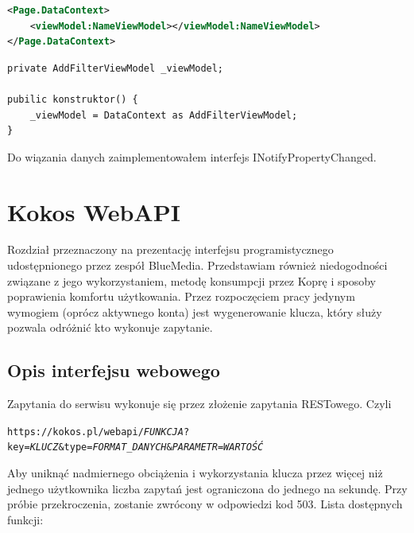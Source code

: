 \documentclass[a4paper,twoside,titlepage,openright]{book}
\begin{document}

\begin{lstlisting}[caption=Podpięcie widok-modelu do Widoku w pliku XAML, label=lst:test, language=xml]
<Page.DataContext>
	<viewModel:NameViewModel></viewModel:NameViewModel>
</Page.DataContext>
\end{lstlisting}


\begin{lstlisting}[caption=Podpięcie widok-modelu w pliku Code-Behind. W konstruktorze inicjalizuje obiekt podając widok-model\, z którym jest spięty., label=lst:test]
private AddFilterViewModel _viewModel;

pubilic konstruktor() {
	_viewModel = DataContext as AddFilterViewModel;
}
\end{lstlisting}

Do wiązania danych zaimplementowałem interfejs INotifyPropertyChanged. 



\section{Kokos WebAPI}

Rozdział przeznaczony na prezentację interfejsu programistycznego udostępnionego przez zespół BlueMedia. Przedstawiam również niedogodności związane z jego wykorzystaniem, metodę konsumpcji przez Koprę i sposoby poprawienia komfortu użytkowania. Przez rozpoczęciem pracy jedynym wymogiem (oprócz aktywnego konta) jest wygenerowanie klucza, który służy pozwala odróżnić kto wykonuje zapytanie.

\subsection{Opis interfejsu webowego}

Zapytania do serwisu wykonuje się przez złożenie zapytania RESTowego. Czyli 

\begin{center}
\texttt{https://kokos.pl/webapi/\textit{FUNKCJA}?key=\textit{KLUCZ}\&type=\textit{FORMAT\_DANYCH}\&\textit{PARAMETR}=\textit{WARTOŚĆ}}
\end{center}

Aby uniknąć nadmiernego obciążenia i wykorzystania klucza przez więcej niż jednego użytkownika liczba zapytań jest ograniczona do jednego na sekundę. Przy próbie przekroczenia, zostanie zwrócony w odpowiedzi kod 503. Lista dostępnych funkcji:
\end{document}
